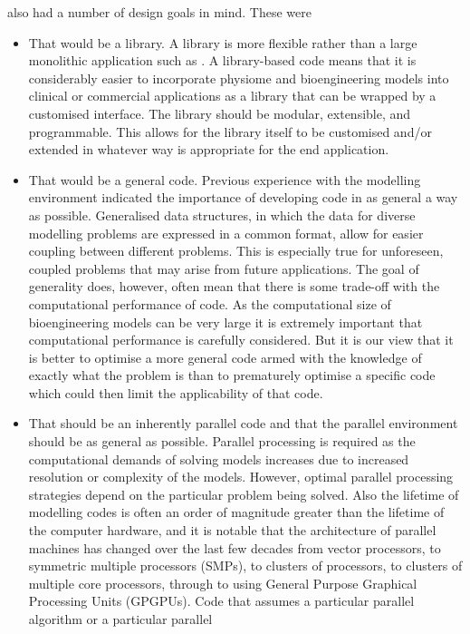 \OpenCMISS also had a number of design goals in mind. These were
\begin{itemize}
  \item That \OpenCMISS would be a library. A library is more flexible
    rather than a large monolithic application such as \CMISS. A
    library-based code means that it is considerably easier to
    incorporate physiome and bioengineering models into clinical or
    commercial applications as a library that can be wrapped by a
    customised interface. The library should be modular, extensible,
    and programmable. This allows for the library itself to be
    customised and/or extended in whatever way is appropriate for the
    end application.
\item That \OpenCMISS would be a general code. Previous experience
  with the \CMISS modelling environment indicated the importance of
  developing code in as general a way as possible. Generalised data
  structures, in which the data for diverse modelling problems are
  expressed in a common format, allow for easier coupling between
  different problems. This is especially true for unforeseen, coupled
  problems that may arise from future applications. The goal of
  generality does, however, often mean that there is some trade-off
  with the computational performance of code. As the computational
  size of bioengineering models can be very large it is extremely
  important that computational performance is carefully
  considered. But it is our view that it is better to optimise a more
  general code armed with the knowledge of exactly what the problem is
  than to prematurely optimise a specific code which could then limit
  the applicability of that code.
\item That \OpenCMISS should be an inherently parallel code and that
  the parallel environment should be as general as possible. Parallel
  processing is required as the computational demands of solving
  models increases due to increased resolution or complexity of the
  models. However, optimal parallel processing strategies depend on
  the particular problem being solved. Also the lifetime of modelling
  codes is often an order of magnitude greater than the lifetime of
  the computer hardware, and it is notable that the architecture of
  parallel machines has changed over the last few decades from vector
  processors, to symmetric multiple processors (SMPs), to clusters of
  processors, to clusters of multiple core processors, through to
  using General Purpose Graphical Processing Units (GPGPUs). Code that
  assumes a particular parallel algorithm or a particular parallel

\end{itemize}
